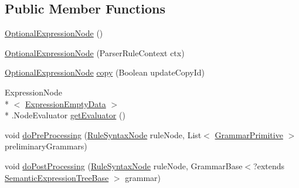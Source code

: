 \subsection*{Public Member Functions}
\begin{DoxyCompactItemize}
\item 
\hyperlink{classit_1_1emarolab_1_1cagg_1_1core_1_1language_1_1syntax_1_1expressionTree_1_1expressionNodeType_1_1OptionalExpressionNode_a2eafeaaa51b5e607a9d111d7885aea57}{Optional\-Expression\-Node} ()
\item 
\hyperlink{classit_1_1emarolab_1_1cagg_1_1core_1_1language_1_1syntax_1_1expressionTree_1_1expressionNodeType_1_1OptionalExpressionNode_a9f04b87751639ce3209e25f17e1f1fd8}{Optional\-Expression\-Node} (Parser\-Rule\-Context ctx)
\item 
\hyperlink{classit_1_1emarolab_1_1cagg_1_1core_1_1language_1_1syntax_1_1expressionTree_1_1expressionNodeType_1_1OptionalExpressionNode}{Optional\-Expression\-Node} \hyperlink{classit_1_1emarolab_1_1cagg_1_1core_1_1language_1_1syntax_1_1expressionTree_1_1expressionNodeType_1_1OptionalExpressionNode_a5bb93428f8ce58d50ef6a3b02c3760d7}{copy} (Boolean update\-Copy\-Id)
\item 
Expression\-Node\\*
$<$ \hyperlink{classit_1_1emarolab_1_1cagg_1_1core_1_1language_1_1syntax_1_1expressionTree_1_1ExpressionDataFactory_1_1ExpressionEmptyData}{Expression\-Empty\-Data} $>$\\*
.Node\-Evaluator \hyperlink{classit_1_1emarolab_1_1cagg_1_1core_1_1language_1_1syntax_1_1expressionTree_1_1expressionNodeType_1_1OptionalExpressionNode_aa3a50c68d4ef7d6ce1394bb7239c2219}{get\-Evaluator} ()
\item 
void \hyperlink{classit_1_1emarolab_1_1cagg_1_1core_1_1language_1_1syntax_1_1expressionTree_1_1expressionNodeType_1_1OptionalExpressionNode_a33bf1ca0df3c2b84c7d9a3e2a04f5398}{do\-Pre\-Processing} (\hyperlink{classit_1_1emarolab_1_1cagg_1_1core_1_1language_1_1syntax_1_1abstractTree_1_1syntaxNodeType_1_1RuleSyntaxNode}{Rule\-Syntax\-Node} rule\-Node, List$<$ \hyperlink{classit_1_1emarolab_1_1cagg_1_1core_1_1language_1_1syntax_1_1GrammarPrimitive}{Grammar\-Primitive} $>$ preliminary\-Grammars)
\item 
void \hyperlink{classit_1_1emarolab_1_1cagg_1_1core_1_1language_1_1syntax_1_1expressionTree_1_1expressionNodeType_1_1OptionalExpressionNode_ae15f6f125cd09c3ccf3ab0693f838a47}{do\-Post\-Processing} (\hyperlink{classit_1_1emarolab_1_1cagg_1_1core_1_1language_1_1syntax_1_1abstractTree_1_1syntaxNodeType_1_1RuleSyntaxNode}{Rule\-Syntax\-Node} rule\-Node, Grammar\-Base$<$?extends \hyperlink{interfaceit_1_1emarolab_1_1cagg_1_1core_1_1evaluation_1_1semanticGrammar_1_1syntaxCompiler_1_1SemanticExpressionTreeBase}{Semantic\-Expression\-Tree\-Base} $>$ grammar)
\end{DoxyCompactItemize}
